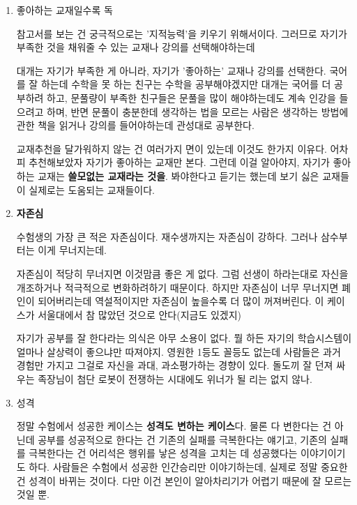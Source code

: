 \vspace{5mm}
\begin{enumerate}

    \item 좋아하는 교재일수록 독
    \vspace{5mm}

    참고서를 보는 건 궁극적으로는 '지적능력'을 키우기 위해서이다.
    그러므로 자기가 부족한 것을 채워줄 수 있는 교재나 강의를 선택해야하는데
    \vspace{5mm}

    대개는 자기가 부족한 게 아니라, 자기가 '좋아하는' 교재나 강의를 선택한다.
    국어를 잘 하는데 수학을 못 하는 친구는 수학을 공부해야겠지만 대개는 국어를 더 공부하려 하고,
    문풀량이 부족한 친구들은 문풀을 많이 해야하는데도 계속 인강을 들으려고 하며,
    반면 문풀이 충분한데 생각하는 법을 모르는 사람은 생각하는 방법에 관한 책을 읽거나 강의를 들어야하는데 관성대로 공부한다.
    \vspace{5mm}

    교재추천을 달가워하지 않는 건 여러가지 면이 있는데 이것도 한가지 이유다.
    어차피 추천해보았자 자기가 좋아하는 교재만 본다. 그런데 이걸 알아야지, 자기가 좋아하는 교재는 \textbf{쓸모없는 교재라는 것을}.
    봐야한다고 듣기는 했는데 보기 싫은 교재들이 실제로는 도움되는 교재들이다.
    \vspace{5mm}

    \item \textbf{자존심}
    \vspace{5mm}

    수험생의 가장 큰 적은 자존심이다.
    재수생까지는 자존심이 강하다. 그러나 삼수부터는 이게 무너지는데.
    \vspace{5mm}

    자존심이 적당히 무너지면 이것맘큼 좋은 게 없다. 그럼 선생이 하라는대로 자신을 개조하거나 적극적으로 변화하려하기 때문이다.
    하지만 자존심이 너무 무너지면 폐인이 되어버리는데 역설적이지만 자존심이 높을수록 더 많이 꺼져버린다.
    이 케이스가 서울대에서 참 많았던 것으로 안다(지금도 있겠지)
    \vspace{5mm}

    자기가 공부를 잘 한다라는 의식은 아무 소용이 없다. 뭘 하든 자기의 학습시스템이 얼마나 살상력이 좋으냐만 따져야지.
    영원한 1등도 꼴등도 없는데 사람들은 과거 경험만 가지고 그걸로 자신을 과대, 과소평가하는 경향이 있다.
    돌도끼 잘 던져 싸우는 족장님이 첨단 로봇이 전쟁하는 시대에도 위너가 될 리는 없지 않나.
    \vspace{5mm}

    \item 성격
    \vspace{5mm}

    정말 수험에서 성공한 케이스는 \textbf{성격도 변하는 케이스}다.
    물론 다 변한다는 건 아닌데 공부를 성공적으로 한다는 건 기존의 실패를 극복한다는 얘기고,
    기존의 실패를 극복한다는 건 어리석은 행위를 낳은 성격을 고치는 데 성공했다는 이야기이기도 하다.
    사람들은 수험에서 성공한 인간승리만 이야기하는데, 실제로 정말 중요한 건 성격이 바뀌는 것이다.
    다만 이건 본인이 알아차리기가 어렵기 때문에 잘 모르는 것일 뿐.
    \vspace{5mm}
\end{enumerate}
